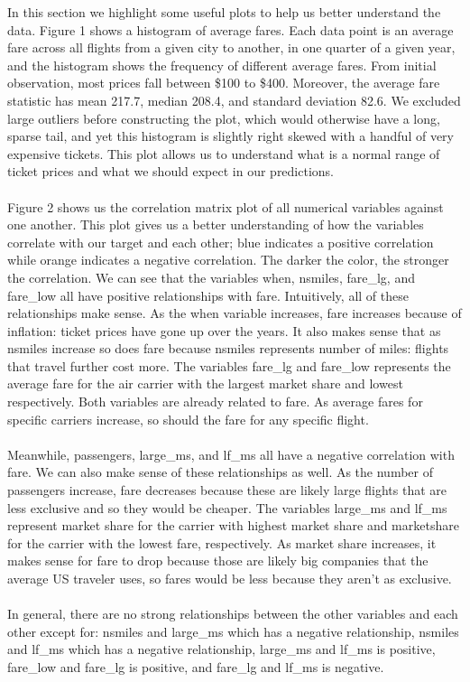 \documentclass{article}
\begin{document}
In this section we highlight some useful plots to help us better understand the data. Figure 1 shows a histogram of average fares. Each data point is an average fare across all flights from a given city to another, in one quarter of a given year, and the histogram shows the frequency of different average fares. From initial observation, most prices fall between \$100 to \$400. Moreover, the average fare statistic has mean 217.7, median 208.4, and standard deviation 82.6. We excluded large outliers before constructing the plot, which would otherwise have a long, sparse tail, and yet this histogram is slightly right skewed with a handful of very expensive tickets. This plot allows us to understand what is a normal range of ticket prices and what we should expect in our predictions. \\\\
Figure 2 shows us the correlation matrix plot of all numerical variables against one another. This plot gives us a better understanding of how the variables correlate with our target and each other; blue indicates a positive correlation while orange indicates a negative correlation. The darker the color, the stronger the correlation. We can see that the variables  when, nsmiles, fare\_lg, and fare\_low all have positive relationships with fare. Intuitively, all of these relationships make sense. As the when variable increases, fare increases because of inflation: ticket prices have gone up over the years. It also makes sense that as nsmiles increase so does fare because nsmiles represents number of miles: flights that travel further cost more. The variables fare\_lg and fare\_low represents the average fare for the air carrier with the largest market share and lowest respectively. Both variables are already related to fare. As average fares for specific carriers increase, so should the fare for any specific flight.\\\\ Meanwhile, passengers, large\_ms, and lf\_ms all have a negative correlation with fare. We can also make sense of these relationships as well. As the number of passengers increase, fare decreases because these are likely large flights that are less exclusive and so they would be cheaper. The variables large\_ms and lf\_ms represent market share for the carrier with highest market share and marketshare for the carrier with the lowest fare, respectively. As market share increases, it makes sense for fare to drop because those are likely big companies that the average US traveler uses, so fares would be less because they aren't as exclusive. \\\\
In general, there are no strong relationships between the other variables and each other except for: nsmiles and large\_ms which has a negative relationship, nsmiles and lf\_ms which has a negative relationship, large\_ms and lf\_ms is positive, fare\_low and fare\_lg is positive, and fare\_lg and lf\_ms is negative.
\end{document}

